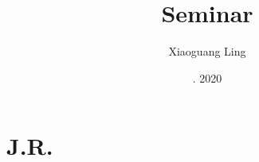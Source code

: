\documentclass{article}
\title{Seminar }
\author{Xiaoguang Ling }
\date{. 2020}
\begin{document}
\maketitle

\section{J.R. }

\subsection{}
\end{document}
